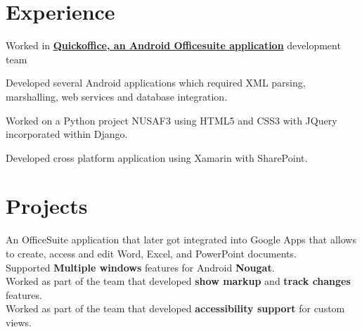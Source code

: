 \documentclass[a4paper]{arun-resume} %
\begin{document}
\hfill
%
%
\begin{minipage}[t]{0.65\textwidth} %


\section{Experience}


\vspace{\topsep} %

\begin{tightitemize}
\item Worked in \textbf{\href{https://en.wikipedia.org/wiki/Quickoffice}{Quickoffice, an Android Officesuite application}} development team
\item Developed several Android applications which required XML parsing, marshalling, web services and database integration.
\item Worked on a Python project NUSAF3 using HTML5 and CSS3 with JQuery incorporated within Django.
\item Developed cross platform application using Xamarin with SharePoint.
\end{tightitemize}

\sectionspace %



\section{Projects}



An OfficeSuite application that later got integrated into Google Apps that allows to
create, access and edit Word, Excel, and PowerPoint documents.\\
Supported \textbf{Multiple windows} features for Android \textbf{Nougat}. \\
Worked as part of the team that developed \textbf{show markup} and \textbf{track changes} features. \\
Worked as part of the team that developed \textbf{accessibility support} for custom views.


\end{minipage}
\end{document}
